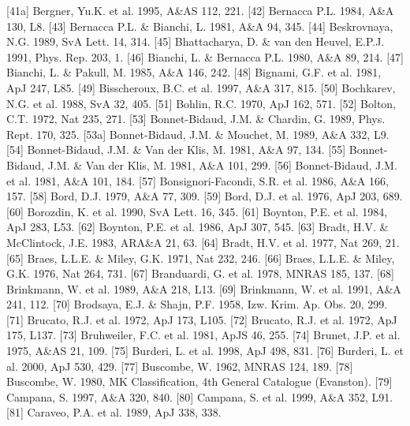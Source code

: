 \documentclass{aa}
\begin{document}
\begin{thebibliography}{}
\bibitem[]{}[41a] Bergner, Yu.K. et al. 1995, A\&AS 112, 221.
\bibitem[]{}[42] Bernacca P.L. 1984, A\&A 130, L8.
\bibitem[]{}[43] Bernacca P.L. \& Bianchi, L. 1981, A\&A 94, 345.
\bibitem[]{}[44] Beskrovnaya, N.G. 1989, SvA Lett. 14, 314.
\bibitem[]{}[45] Bhattacharya, D. \& van den Heuvel, E.P.J. 1991, Phys. Rep. 203, 1. 
\bibitem[]{}[46] Bianchi, L. \& Bernacca P.L. 1980, A\&A 89, 214.
\bibitem[]{}[47] Bianchi, L. \& Pakull, M. 1985, A\&A 146,  242.
\bibitem[]{}[48] Bignami, G.F. et al. 1981, ApJ 247, L85.
\bibitem[]{}[49] Bisscheroux, B.C. et al. 1997, A\&A 317, 815.
\bibitem[]{}[50] Bochkarev, N.G. et al. 1988, SvA 32, 405.
\bibitem[]{}[51] Bohlin, R.C. 1970, ApJ 162, 571.
\bibitem[]{}[52] Bolton, C.T. 1972, Nat 235, 271.
\bibitem[]{}[53] Bonnet-Bidaud, J.M. \& Chardin, G. 1989, Phys. Rept. 170, 325.
\bibitem[]{}[53a] Bonnet-Bidaud, J.M. \& Mouchet, M. 1989, A\&A 332, L9.
\bibitem[]{}[54] Bonnet-Bidaud, J.M. \& Van der Klis, M. 1981, A\&A 97, 134.
\bibitem[]{}[55] Bonnet-Bidaud, J.M. \& Van der Klis, M. 1981, A\&A 101, 299.
\bibitem[]{}[56] Bonnet-Bidaud, J.M. et al. 1981, A\&A 101, 184.
\bibitem[]{}[57] Bonsignori-Facondi, S.R. et al. 1986, A\&A 166, 157.
\bibitem[]{}[58] Bord, D.J. 1979, A\&A 77, 309.
\bibitem[]{}[59] Bord, D.J. et al. 1976, ApJ 203, 689.
\bibitem[]{}[60] Borozdin, K. et al. 1990, SvA Lett. 16, 345.
\bibitem[]{}[61] Boynton, P.E. et al. 1984, ApJ 283, L53.
\bibitem[]{}[62] Boynton, P.E. et al. 1986, ApJ 307, 545.
\bibitem[]{}[63] Bradt, H.V. \& McClintock, J.E. 1983, ARA\&A 21, 63.
\bibitem[]{}[64] Bradt, H.V. et al. 1977, Nat 269, 21.
\bibitem[]{}[65] Braes, L.L.E. \& Miley, G.K. 1971, Nat 232, 246.
\bibitem[]{}[66] Braes, L.L.E. \& Miley, G.K. 1976, Nat 264, 731.
\bibitem[]{}[67] Branduardi, G. et al. 1978, MNRAS 185, 137.
\bibitem[]{}[68] Brinkmann, W. et al. 1989, A\&A 218, L13.
\bibitem[]{}[69] Brinkmann, W. et al. 1991, A\&A 241, 112.
\bibitem[]{}[70] Brodsaya, E.J. \& Shajn, P.F. 1958, Izw. Krim. Ap. Obs. 20, 299.
\bibitem[]{}[71] Brucato, R.J. et al. 1972, ApJ 173, L105.
\bibitem[]{}[72] Brucato, R.J. et al. 1972, ApJ 175, L137.
\bibitem[]{}[73] Bruhweiler, F.C. et al. 1981, ApJS 46, 255.
\bibitem[]{}[74] Brunet, J.P. et al. 1975, A\&AS 21, 109.
\bibitem[]{}[75] Burderi, L. et al. 1998, ApJ 498, 831.
\bibitem[]{}[76] Burderi, L. et al. 2000, ApJ 530, 429.
\bibitem[]{}[77] Buscombe, W. 1962, MNRAS 124, 189.
\bibitem[]{}[78] Buscombe, W. 1980, MK Classification, 4th General Catalogue (Evanston).
\bibitem[]{}[79] Campana, S. 1997, A\&A 320, 840.
\bibitem[]{}[80] Campana, S. et al. 1999, A\&A 352, L91.                        
\bibitem[]{}[81] Caraveo, P.A. et al. 1989, ApJ 338, 338.

\end{thebibliography}
\end{document}
